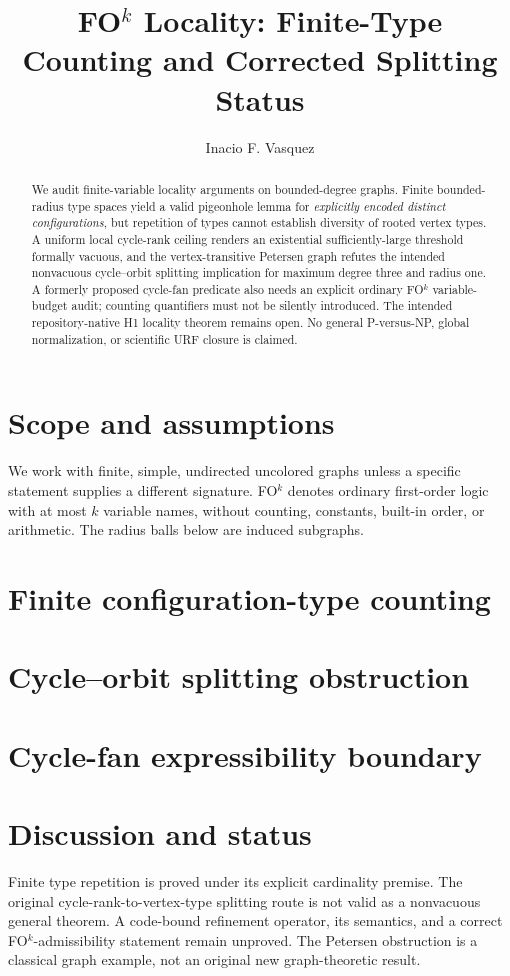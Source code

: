 \documentclass[11pt]{article}
\title{FO$^k$ Locality: Finite-Type Counting and Corrected Splitting Status}
\author{Inacio F. Vasquez}
\date{}
\begin{document}
\maketitle

\begin{abstract}
We audit finite-variable locality arguments on bounded-degree graphs.
Finite bounded-radius type spaces yield a valid pigeonhole lemma for
\emph{explicitly encoded distinct configurations}, but repetition of
types cannot establish diversity of rooted vertex types. A uniform
local cycle-rank ceiling renders an existential sufficiently-large
threshold formally vacuous, and the vertex-transitive Petersen graph
refutes the intended nonvacuous cycle--orbit splitting implication for
maximum degree three and radius one. A formerly proposed cycle-fan
predicate also needs an explicit ordinary FO$^k$ variable-budget audit;
counting quantifiers must not be silently introduced. The intended
repository-native H1 locality theorem remains open. No general
P-versus-NP, global normalization, or scientific URF closure is claimed.
\end{abstract}

\section{Scope and assumptions}
We work with finite, simple, undirected uncolored graphs unless a
specific statement supplies a different signature. FO$^k$ denotes
ordinary first-order logic with at most $k$ variable names, without
counting, constants, built-in order, or arithmetic. The radius balls
below are induced subgraphs.

\section{Finite configuration-type counting}


\section{Cycle--orbit splitting obstruction}


\section{Cycle-fan expressibility boundary}


\section{Discussion and status}
Finite type repetition is proved under its explicit cardinality premise.
The original cycle-rank-to-vertex-type splitting route is not valid as a
nonvacuous general theorem. A code-bound refinement operator, its
semantics, and a correct FO$^k$-admissibility statement remain unproved.
The Petersen obstruction is a classical graph example, not an original
new graph-theoretic result.
\end{document}
